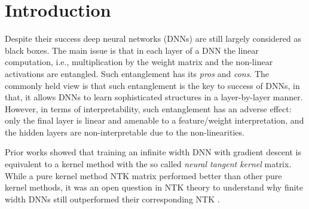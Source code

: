 \section{Introduction}\label{sec:intro}
Despite their success deep neural networks (DNNs) are still largely considered as black boxes.  The main issue is that in each layer of a DNN the linear computation, i.e., multiplication by the weight matrix  and the non-linear activations are entangled. Such entanglement has its \emph{pros} and \emph{cons}. The commonly held view  is that such entanglement is the key to success of DNNs, in that, it allows DNNs to learn sophisticated structures in a layer-by-layer manner. However, in terms of interpretability, such entanglement has an adverse effect: only the final layer is linear and amenable to a feature/weight interpretation, and the hidden layers are non-interpretable due to the non-linearities. 

Prior works \citep{ntk,arora2019exact,cao2019generalization} showed that training an infinite width DNN with gradient descent is equivalent to a kernel method with the so called \emph{neural tangent kernel} matrix. While a pure kernel method NTK matrix performed better than other pure kernel methods, it was an open question in NTK theory to understand why finite width DNNs still outperformed their corresponding NTK \citep{arora2019exact}. %

